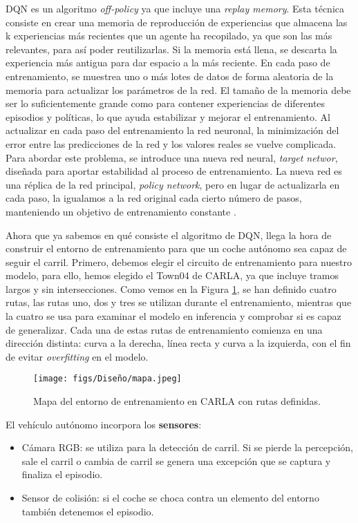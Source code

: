 \ac{DQN} es un algoritmo \textit{off-policy} ya que incluye una \textit{replay memory}. Esta técnica consiste en crear una memoria de reproducción de experiencias que almacena las k experiencias más recientes que un agente ha recopilado, ya que son las más relevantes, para así poder reutilizarlas. Si la memoria está llena, se descarta la experiencia más antigua para dar espacio a la más reciente. En cada paso de entrenamiento, se muestrea uno o más lotes de datos de forma aleatoria de la memoria para actualizar los parámetros de la red. El tamaño de la memoria debe ser lo suficientemente grande como para contener experiencias de diferentes episodios y políticas, lo que ayuda estabilizar y mejorar el entrenamiento. Al actualizar en cada paso del entrenamiento la red neuronal, la minimización del error entre las predicciones de la red y los valores reales se vuelve complicada. Para abordar este problema, se introduce una nueva red neural, \textit{target networ}, diseñada para aportar estabilidad al proceso de entrenamiento. La nueva red es una réplica de la red principal, \textit{policy network}, pero en lugar de actualizarla en cada paso, la igualamos a la red original cada cierto número de pasos, manteniendo un objetivo de entrenamiento constante \cite{drl}.

Ahora que ya sabemos en qué consiste el algoritmo de \ac{DQN}, llega la hora de construir el entorno de entrenamiento para que un coche autónomo sea capaz de seguir el carril. Primero, debemos elegir el circuito de entrenamiento para nuestro modelo, para ello, hemos elegido el Town04 de CARLA, ya que incluye tramos largos y sin intersecciones. Como vemos en la Figura \ref{fig:mapa}, se han definido cuatro rutas, las rutas uno, dos y tres se utilizan durante el entrenamiento, mientras que la cuatro se usa para examinar el modelo en inferencia y comprobar si es capaz de generalizar. Cada una de estas rutas de entrenamiento comienza en una dirección distinta: curva a la derecha, línea recta y curva a la izquierda, con el fin de evitar \textit{overfitting} en el modelo.

\begin{figure}[ht]
  \centering
  \texttt{[image: figs/Diseño/mapa.jpeg]}
  \caption{Mapa del entorno de entrenamiento en CARLA con rutas definidas.}
  \label{fig:mapa}
\end{figure}

El vehículo autónomo incorpora los \textbf{sensores}:
\begin{itemize}
		\item Cámara RGB: se utiliza para la detección de carril. Si se pierde la percepción, sale el carril o cambia de carril se genera una excepción que se captura y finaliza el episodio.
		\item Sensor de colisión: si el coche se choca contra un elemento del entorno también detenemos el episodio.
\end{itemize}


